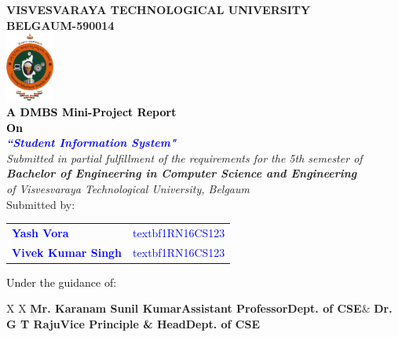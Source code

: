 \thispagestyle{empty}
\begin{titlepage}
\begin{center}
\textup{\large {\textcolor{darkbrown}{\bf VISVESVARAYA TECHNOLOGICAL UNIVERSITY} \\ {\textcolor{darkbrown}{\bf BELGAUM-590014}}}}\\
\includegraphics[width=0.12\textwidth]{../static/media/VTU.png}\\
\textup{\small {\textcolor{black}{\textbf {A DMBS Mini-Project Report} \\ {\textbf {On}}}}} \\
\textup{\large {\textcolor{blue}{\textbf {\textit {``Student Information System"}}}}} \\[0.2in]
\textup{{\textit {Submitted in partial fulfillment of the requirements for the 5th semester of} \\ {\textbf {\textit {Bachelor of Engineering in Computer Science and Engineering}} \\ \textit {of Visvesvaraya Technological University, Belgaum}}}}\\


\textup{{Submitted by:}} 
\break\break
\begin{tabular}{l l}
\textcolor{blue}{\textbf{Yash Vora}} & \textcolor{blue}{\hspace{2.7cm}textbf{1RN16CS123}}\\ 
\textcolor{blue}{\textbf{Vivek Kumar Singh}} & \textcolor{blue}{\hspace{2.7cm}textbf{1RN16CS123}}\\ 
\end{tabular}
\vfill
\textup{\normalsize{\textcolor{black}{ Under the guidance of:}}}\break\break
\renewcommand\tabularxcolumn[1]{>{\Centering}p{#1}}

\begin{tabularx}{\linewidth}{X X }
\textbf{Mr. Karanam Sunil Kumar}\linebreak\textbf{Assistant Professor}\linebreak\textbf{Dept. of CSE}\linebreak & 
\textbf{Dr. G T Raju}\linebreak\textbf{Vice Principle & Head}\linebreak\textbf{Dept. of CSE}\linebreak 
\end{tabularx}


\end{center}
\end{titlepage}
